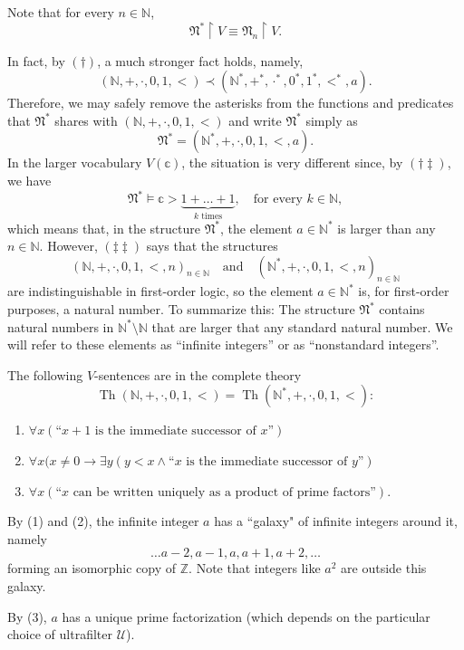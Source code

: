 \documentclass{scrartcl}
\DeclareMathOperator{\Th}{Th}
\begin{document}
\begin{example}
Note that for every $n\in \mathbb{N}$,
\[
\mathfrak{N}^*\upharpoonright V
\equiv \mathfrak{N}_n \upharpoonright V.
\]

In fact, by $(\dagger)$, a much stronger fact holds, namely,
\[
\tag{$\ddagger\ddagger$}
(\mathbb{N},+,\cdot,0,1,<)\prec (\mathbb{N}^*,+^*,\cdot^*,0^*,1^*,<^*,a).
\]
Therefore, we may safely remove the asterisks from the functions and predicates that $\mathfrak{N}^*$ shares with $(\mathbb{N},+,\cdot,0,1,<)$ and write $\mathfrak{N}^*$ simply as
\[
\mathfrak{N}^*=(\mathbb{N}^*,+,\cdot,0,1,<,a).
\]
In the larger vocabulary $V(\mathbb c)$, the situation is very different since, by $(\dagger\ddagger)$, we have
\[
\mathfrak{N}^*\models 
\mathbb c > \underbrace{1+\dots+1}_{k\text{ times}},
\quad
\text{for every $k\in\mathbb{N}$},
\]
which means that, in the structure $\mathfrak{N}^*$, the element $a\in\mathbb{N}^*$ is larger than any $n\in\mathbb{N}$. However, $(\ddagger\ddagger)$ says that the structures
\[
(\mathbb{N},+,\cdot,0,1,<, n)_{n\in\mathbb{N}}
\quad\text{and}\quad
(\mathbb{N}^*,+,\cdot,0,1,<, n)_{n\in\mathbb{N}}
\]
are indistinguishable in first-order logic, so the element $a\in\mathbb{N}^*$ is, for first-order purposes, a natural number.
To summarize this: The structure $\mathfrak{N}^*$ contains natural numbers in $\mathbb{N}^*\setminus \mathbb{N}$ that are larger that any standard natural number. We will refer to these elements as ``infinite integers'' or as ``nonstandard integers''.

The following $V$-sentences are in the complete theory
\[
\Th(\mathbb{N},+,\cdot,0,1,<)=\Th (\mathbb{N}^*,+,\cdot,0,1,<):
\]
\begin{enumerate}[(1)]
\item
$\forall x(\text{``$x+1$ is the immediate successor of $x$''})$
\item
$\forall x(x\neq 0 \to \exists y(y<x \land\text{``$x$ is the immediate successor of $y$''})$
\item
$\forall x(\text{``$x$ can be written uniquely as a product of prime factors''})$.
\end{enumerate}

By (1) and (2), the infinite integer $a$ has a ``galaxy" of infinite integers around it, namely
\[
\dots a-2,  a-1,a, a+1, a+2,\dots
\]
forming an isomorphic copy of $\mathbb{Z}$. Note that integers like $a^2$ are outside this galaxy.

By (3), $a$ has a unique prime factorization (which depends on the particular choice of ultrafilter $\mathscr{U}$).


\end{example}
\end{document}
